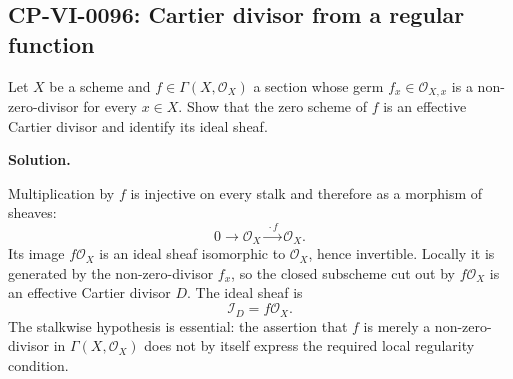 
\subsection*{CP-VI-0096: Cartier divisor from a regular function}

Let $X$ be a scheme and $f\in\Gamma(X,\mathcal O_X)$ a section
whose germ $f_x\in\mathcal O_{X,x}$ is a non-zero-divisor for every
$x\in X$. Show that the zero scheme of $f$ is an effective Cartier
divisor and identify its ideal sheaf.

\medskip
\noindent\textbf{Solution.}

Multiplication by $f$ is injective on every stalk and therefore
as a morphism of sheaves:
\[
0\longrightarrow\mathcal O_X\xrightarrow{\,\cdot f\,}\mathcal O_X.
\]
Its image $f\mathcal O_X$ is an ideal sheaf isomorphic to
$\mathcal O_X$, hence invertible. Locally it is generated by the
non-zero-divisor $f_x$, so the closed subscheme cut out by
$f\mathcal O_X$ is an effective Cartier divisor $D$.
The ideal sheaf is
\[
\boxed{\mathcal I_D=f\mathcal O_X.}
\]
The stalkwise hypothesis is essential: the assertion that $f$ is
merely a non-zero-divisor in $\Gamma(X,\mathcal O_X)$ does not by
itself express the required local regularity condition.
